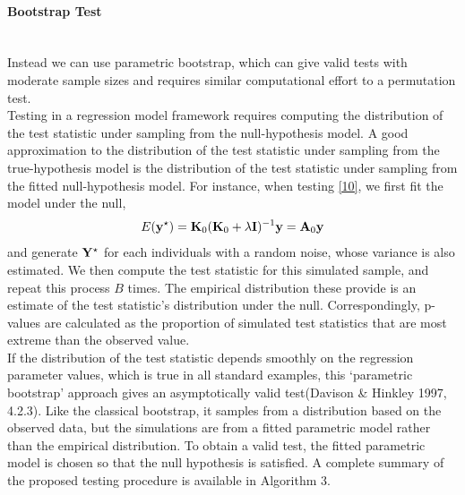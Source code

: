 \documentclass[11pt]{article}
\begin{document}
\paragraph{Bootstrap Test}\mbox{}\\
Instead we can use parametric bootstrap, which can give valid tests with moderate sample sizes and requires similar computational effort to a permutation test.\\
Testing in a regression model framework requires computing the distribution of the test statistic under sampling from the null-hypothesis model. A good approximation to the distribution of the test statistic under sampling from the true-hypothesis model is the distribution of the test statistic under sampling from the fitted null-hypothesis model. For instance, when testing \eqref{10}, we first fit the model under the null,
\begin{align}
E({\bf y}^\star)={\bf K}_0({\bf K}_0+\lambda {\bf I})^{-1}{\bf y}={\bf A}_0{\bf y} 
\end{align}
and generate ${\bf Y}^\star$ for each individuals with a random noise, whose variance is also estimated. We then compute the test statistic for this simulated sample, and repeat this process $B$ times. The empirical distribution these provide is an estimate of the test statistic's distribution under the null. Correspondingly, p-values are calculated as the proportion of simulated test statistics that are most extreme than the observed value.\\
If the distribution of the test statistic depends smoothly on the regression parameter values, which is true in all standard examples, this ‘parametric bootstrap’ approach gives an asymptotically valid test(Davison \& Hinkley 1997, 4.2.3). Like the classical bootstrap, it samples from a distribution based on the observed data, but the simulations are from a fitted parametric model rather than the empirical distribution. To obtain a valid test, the fitted parametric model is chosen so that the null hypothesis is satisfied.
A complete summary of the proposed testing procedure is available in Algorithm 3.\\
\end{document}
